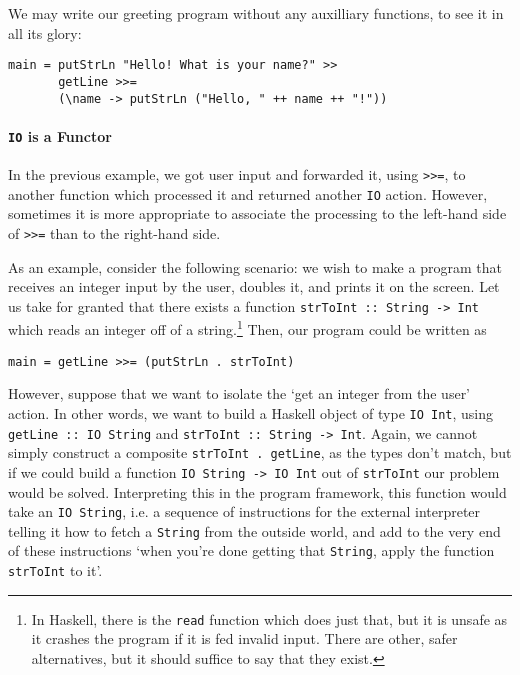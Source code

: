\documentclass[11pt]{article}
\theoremstyle{nonumberplain}
\newcommand*\lsin{\lstinline}
\begin{document}
We may write our greeting program without any auxilliary functions, to see it in all its glory:
\begin{lstlisting}
main = putStrLn "Hello! What is your name?" >>
       getLine >>=
       (\name -> putStrLn ("Hello, " ++ name ++ "!"))
\end{lstlisting}


\paragraph{\texttt{IO} is a Functor}

In the previous example, we got user input and forwarded it, using \lsin|>>=|, to another function which processed it and returned another \lsin|IO| action. However, sometimes it is more appropriate to associate the processing to the left-hand side of \lsin|>>=| than to the right-hand side.

As an example, consider the following scenario: we wish to make a program that receives an integer input by the user, doubles it, and prints it on the screen. Let us take for granted that there exists a function \lsin|strToInt :: String -> Int| which reads an integer off of a string.\footnote{In Haskell, there is the \lsin|read| function which does just that, but it is unsafe as it crashes the program if it is fed invalid input. There are other, safer alternatives, but it should suffice to say that they exist.} Then, our program could be written as
\begin{lstlisting}
main = getLine >>= (putStrLn . strToInt)
\end{lstlisting}

However, suppose that we want to isolate the `get an integer from the user' action. In other words, we want to build a Haskell object of type \lsin|IO Int|, using \lsin|getLine :: IO String| and \lsin|strToInt :: String -> Int|. Again, we cannot simply construct a composite \lsin|strToInt . getLine|, as the types don't match, but if we could build a function \lsin|IO String -> IO Int| out of \lsin|strToInt| our problem would be solved. Interpreting this in the program framework, this function would take an \lsin|IO String|, i.e. a sequence of instructions for the external interpreter telling it how to fetch a \lsin|String| from the outside world, and add to the very end of these instructions `when you're done getting that \lsin|String|, apply the function \lsin|strToInt| to it'. 
\end{document}
